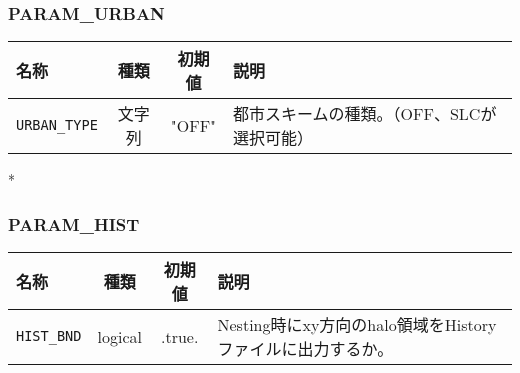 \subsubsection{PARAM\_URBAN}
\begin{tabularx}{150mm}{|l|c|c|X|} \hline
 \rowcolor[gray]{0.9} 名称 & 種類 & 初期値 & 説明 \\ \hline
 \verb|URBAN_TYPE| & 文字列 & "OFF" & 都市スキームの種類。（OFF、SLCが選択可能）\\ \hline
\end{tabularx}

*
\subsubsection{PARAM\_HIST}
\begin{tabularx}{150mm}{|l|c|c|X|} \hline
 \rowcolor[gray]{0.9} 名称 & 種類 & 初期値 & 説明 \\ \hline
 \verb|HIST_BND| & logical & .true. & Nesting時にxy方向のhalo領域をHistoryファイルに出力するか。 \\ \hline
\end{tabularx}


